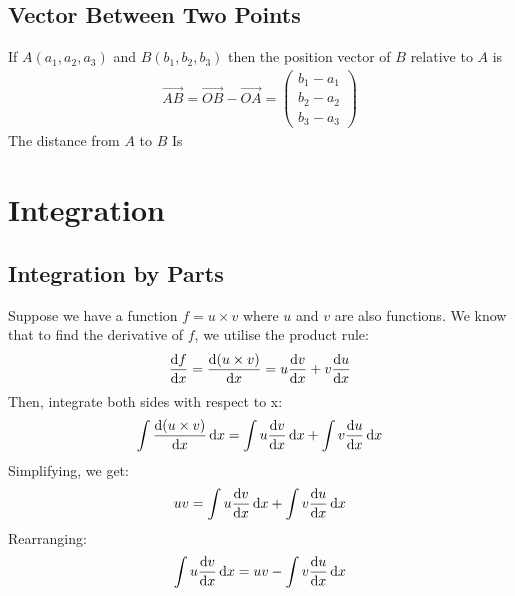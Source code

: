 \documentclass[10pt, a4paper, titlepage]{article}
\begin{document}
\begin{multicols*}{3}
	\dotfill
	\subsection{Vector Between Two Points}
	If $A(a_1,a_2,a_3)$ and $B(b_1,b_2,b_3)$ then the position vector of $B$ relative to $A$ is 
	\begin{align}
		\overrightarrow{AB}=\overrightarrow{OB}-\overrightarrow{OA}=\begin{pmatrix}b_1-a_1\\ b_2-a_2 \\b_3-a_3\end{pmatrix}
	\end{align}
	The distance from $A$ to $B$ Is


\hrulefill
\section{Integration}
	\subsection{Integration by Parts}
	Suppose we have a function $f = u\times v$ where $u$ and $v$ are also functions. We know that to find the derivative of $f$, we utilise the product rule:
	\begin{align}
		\dv{f}{x} = \dv{(u \times v)}{x} = u\dv{v}{x} + v\dv{u}{x}
	\end{align}
	Then, integrate both sides with respect to x:
	\begin{align}
		\int{\dv{(u \times v)}{x} \, \dd x} = \int{u\dv{v}{x} \, \dd x} + \int{v\dv{u}{x} \, \dd x}
	\end{align}
	Simplifying, we get:
	\begin{align}
		uv = \int{u\dv{v}{x} \, \dd x} + \int{v\dv{u}{x} \, \dd x}
	\end{align}
	Rearranging:
	\begin{align}
		\int{u\dv{v}{x} \, \dd x} = uv - \int{v\dv{u}{x} \, \dd x}
	\end{align}


\end{multicols*}
\end{document}
